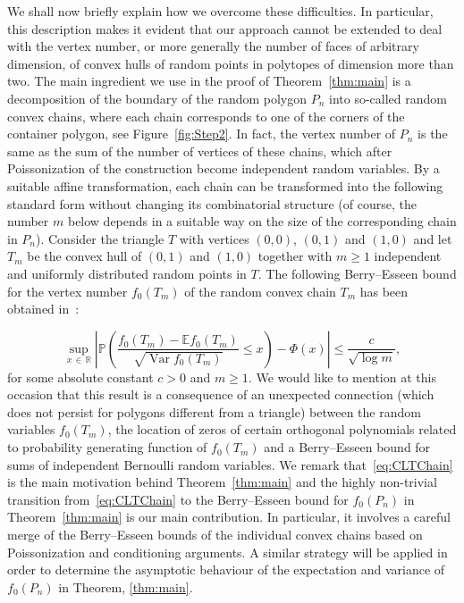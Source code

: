 \documentclass[AHL,Unicode,longabstracts,published]{cedram}
\newcommand{\var}{\operatorname{Var}}
\newcommand{\bbR}{\mathbb{R}}
\newcommand{\bbE}{\mathbb{E}}
\newcommand{\bbP}{\mathbb{P}}
\begin{document}
We shall now briefly explain how we overcome these difficulties. In particular, this description makes it evident that our approach cannot be extended to deal with the vertex number, or more generally the number of faces of arbitrary dimension, of convex hulls of random points in polytopes of dimension more than two. The main ingredient we use in the proof of Theorem~\ref{thm:main} is a decomposition of the boundary of the random polygon $P_n$ into so-called random convex chains, where each chain corresponds to one of the corners of the container polygon, see Figure~\ref{fig:Step2}. In fact, the vertex number of $P_n$ is the same as the sum of the number of vertices of these chains, which after Poissonization of the construction become independent random variables. By a suitable affine transformation, each chain can be transformed into the following standard form without changing its combinatorial structure (of course, the number $m$ below depends in a suitable way on the size of the corresponding chain in $P_n$). Consider the triangle $T$ with vertices $(0,0)$, $(0,1)$ and $(1,0)$ and let $T_m$ be the convex hull of $(0,1)$ and $(1,0)$ together with $m\geq 1$ independent and uniformly distributed random points in $T$. The following Berry--Esseen bound for the vertex number $f_0(T_m)$ of the random convex chain $T_m$ has been obtained in~\cite[Corollary~9]{GT21}:

\begin{equation}\label{eq:CLTChain}
\sup_{x\,\in\,\bbR}\left|\bbP\left(\frac{f_0(T_m)-\bbE f_0(T_m)}{\sqrt{\var f_0(T_m)}}\leq x\right)-\Phi(x)\right|\leq \frac{c}{\sqrt{\log m}},
\end{equation}
for some absolute constant $c>0$ and $m\geq 1$. We would like to mention at this occasion that this result is a consequence of an unexpected connection (which does not persist for polygons different from a triangle) between the random variables $f_0(T_m)$, the location of zeros of certain orthogonal polynomials related to probability generating function of $f_0(T_m)$ and a Berry--Esseen bound for sums of independent Bernoulli random variables. We remark that~\eqref{eq:CLTChain} is the main motivation behind Theorem~\ref{thm:main} and the highly non-trivial transition from~\eqref{eq:CLTChain} to the Berry--Esseen bound for $f_0(P_n)$ in Theorem~\ref{thm:main} is our main contribution. In particular, it involves a careful merge of the Berry--Esseen bounds of the individual convex chains based on Poissonization and conditioning arguments. A similar strategy will be applied in order to determine the asymptotic behaviour of the expectation and variance of $f_0(P_n)$ in Theorem, \ref{thm:main}.
\end{document}
